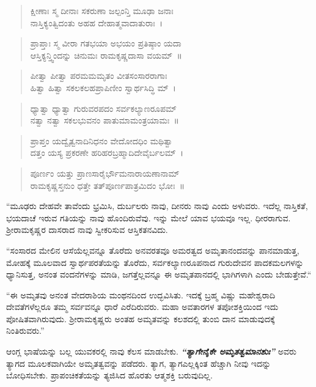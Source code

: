 \newpage

\begin{verse}
 ಕ್ಷೀಣಾಃ ಸ್ಮ ದೀನಾಃ ಸಕರುಣಾ ಜಲ್ಪಂನ್ತಿ ಮೂಢಾ ಜನಾಃ\\
 ನಾಸ್ತಿಕ್ಯಂತ್ವಿದಂತು ಅಹಹ ದೇಹಾತ್ಮವಾದಾತುರಾಃ~। 
\end{verse}

\begin{verse}
 ಪ್ರಾಪ್ತಾಃ ಸ್ಮ ವೀರಾ ಗತಭಯಾ ಅಭಯಂ ಪ್ರತಿಷ್ಠಾಂ ಯದಾ\\
 ಆಸ್ತಿಕ್ಯನ್ತ್ವಿಂದನ್ನು ಚಿನುಮಃ ರಾಮಕೃಷ್ಣದಾಸಾ ವಯಮ್~॥ 
\end{verse}

\begin{verse}
 ಪೀತ್ವಾ ಪೀತ್ವಾ ಪರಮಮಮೃತಂ ವೀತಸಂಸಾರರಾಗಾಃ\\
 ಹಿತ್ವಾ ಹಿತ್ವಾ ಸಕಲಕಲಹಪ್ರಾಪಿಣೀಂ ಸ್ವಾರ್ಥಸಿದ್ಧಿ ಮ್~। 
\end{verse}

\begin{verse}
 ಧ್ಯಾತ್ವಾ ಧ್ಯಾತ್ವಾ ಗುರುವರಪದಂ ಸರ್ವಕಲ್ಯಾಣರೂಪಮ್\\
 ನತ್ವಾ ನತ್ವಾ ಸಕಲಭುವನಂ ಪಾತುಮಾಮಂತ್ರಯಾಮಃ~॥ 
\end{verse}

\begin{verse}
 ಪ್ರಾಪ್ತಂ ಯದ್ವೈತ್ವನಾದಿನಿಧನಂ ವೇದೋದಧಿಂ ಮಥಿತ್ವಾ\\
 ದತ್ತಂ ಯಸ್ಯ ಪ್ರಕರಣೇ ಹರಿಹರಬ್ರಹ್ಮಾದಿದೇವೈರ್ಬಲಮ್~। 
\end{verse}

\begin{verse}
 ಪೂರ್ಣಂ ಯತ್ತು ಪ್ರಾಣಸಾರೈರ್ಭೌಮನಾರಾಯಣಾನಾಮ್\\
 ರಾಮಕೃಷ್ಣಸ್ತನುಂ ಧತ್ತೇ ತತ್‌ಪೂರ್ಣಪಾತ್ರಮಿದಂ ಭೋಃ~॥ 
\end{verse}

“ಮೂಢರು ದೇಹವೇ ತಾವೆಂದು ಭ್ರಮಿಸಿ, ದುರ್ಬಲರು ನಾವು, ದೀನರು ನಾವು ಎಂದು ಅಳುವರು. ಇದೆಲ್ಲ ನಾಸ್ತಿಕತೆ, ಭಯದಾಚೆ ಇರುವ ಗತಿಯನ್ನು ನಾವು ಹೊಂದಿರುವೆವು. ಇನ್ನು ಮೇಲೆ ಯಾವ ಭಯವೂ ಇಲ್ಲ. ಧೀರರಾಗುವ. ಶ‍್ರೀರಾಮಕೃಷ್ಣರ ದಾಸರಾದ ನಾವು ಸ್ವೀಕರಿಸುವ ಆಸ್ತಿಕತನವಿದು.

“ಸಂಸಾರದ ಮೇಲಿನ ಆಸೆಯೆಲ್ಲವನ್ನೂ ತೊರೆದು ಅನವರತವೂ ಅಮರತ್ವದ ಅಮೃತಾನಂದವನ್ನು ಪಾನಮಾಡುತ್ತ, ಮೋಹಕ್ಕೆ ಮೂಲವಾದ ಸ್ವಾರ್ಥಪರತೆಯನ್ನು ತೊರೆದು, ಸರ್ವಕಲ್ಯಾಣರೂಪನಾದ ಗುರುದೇವನ ಪಾದಕಮಲಗಳನ್ನು ಧ್ಯಾನಿಸುತ್ತ, ಅನಂತ ವಂದನೆಗಳನ್ನು ಮಾಡಿ, ಜಗತ್ತೆಲ್ಲವನ್ನೂ ಈ ಅಮೃತಪಾನದಲ್ಲಿ ಭಾಗಿಗಳಾಗಿ ಎಂದು ಬೇಡುತ್ತೇವೆ.“

“ಈ ಅಮೃತವು ಅನಂತ ವೇದರಾಶಿಯ ಮಂಥನದಿಂದ ಉದ್ಭವಿಸಿತು. ಇದಕ್ಕೆ ಬ್ರಹ್ಮ ವಿಷ್ಣು ಮಹೇಶ್ವರಾದಿ ದೇವತೆಗಳೆಲ್ಲರೂ ತಮ್ಮ ಸರ್ವವನ್ನೂ ಧಾರೆ ಎರೆದಿರುವರು. ಮಹಾ ಅವತಾರಗಳ ತಪೋಶಕ್ತಿಯಿಂದ ಇದು ಪೋಷಿತವಾಗಿರುವುದು. ಶ‍್ರೀರಾಮಕೃಷ್ಣರು ಅಂತಹ ಅಮೃತವನ್ನು ಕಲಶದಲ್ಲಿ ತುಂಬಿ ದಾನ ಮಾಡುವುದಕ್ಕೆ ನಿಂತಿರುವರು.”

ಆಂಗ್ಲ ಭಾಷೆಯನ್ನು ಬಲ್ಲ ಯುವಕರಲ್ಲಿ ನಾವು ಕೆಲಸ ಮಾಡಬೇಕು. \textbf{\textit{ “ತ್ಯಾಗೇನೈಕೇ ಅಮೃತತ್ವಮಾನಶುಃ”}} ಅವರು ತ್ಯಾಗದ ಮೂಲಕವಾಗಿಯೇ ಅಮೃತತ್ವವನ್ನು ಪಡೆದರು. ತ್ಯಾಗ, ತ್ಯಾಗ\enginline{-}ಎಲ್ಲಕ್ಕಿಂತ ಹೆಚ್ಚಾಗಿ ನೀವು ಇದನ್ನು ಬೋಧಿಸಬೇಕು. ಪ್ರಾಪಂಚಿಕತೆಯನ್ನು ತ್ಯಜಿಸಿದ ಹೊರತು ಆತ್ಮಶಕ್ತಿ ಬರುವುದಿಲ್ಲ.


